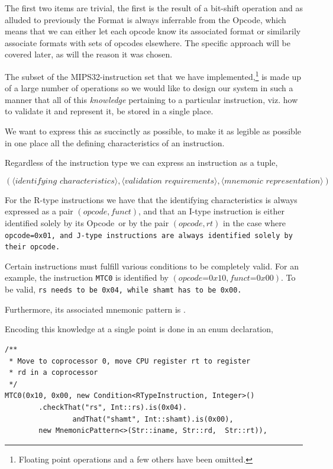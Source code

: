 \documentclass[a4paper]{article}
\newcommand{\opcode}{Opcode\ }
\begin{document}
The first two items are trivial, the first is the result of a
bit-shift operation and as alluded to previously the Format is always
inferrable from the Opcode, which means that we can either let each
opcode know its associated format or similarily associate formats
with sets of opcodes elsewhere. The specific approach will be covered
later, as will the reason it was chosen.

The subset of the MIPS32-instruction set that we have
implemented,\footnote{Floating point operations and a few others have
  been omitted.} is made up of a large number of operations so we would
like to design our system in such a manner that all of this
\emph{knowledge} pertaining to a particular instruction, viz. how to
validate it and represent it, be stored in a single place.

We want to express this as succinctly as possible, to make it as
legible as possible in one place all the defining characteristics
of an instruction.

Regardless of the instruction type we can express an instruction
as a tuple,

\begin{equation*}
(\langle \textit{identifying characteristics} \rangle, \langle
  \textit{validation requirements} \rangle, \langle \textit{mnemonic
    representation} \rangle)
\end{equation*}

For the R-type instructions we have that the identifying
characteristics is always expressed as a pair $(\textit{opcode},
\textit{funct})$, and that an I-type instruction is either identified
solely by its \opcode or by the pair $(\textit{opcode}, \textit{rt})$
in the case where \tt{opcode=0x01}, and J-type instructions are always
identified solely by their opcode.

Certain instructions must fulfill various conditions to be completely
valid. For an example, the instruction \texttt{MTC0} is identified by
$(\textit{opcode=0x10}, \textit{funct=0x00})$. To be valid, \tt{rs}
needs to be \tt{0x04}, while \tt{shamt} has to be \tt{0x00}.

Furthermore, its associated mnemonic pattern is .

Encoding this knowledge at a single point is done in an enum declaration,

\begin{verbatim}
/**
 * Move to coprocessor 0, move CPU register rt to register
 * rd in a coprocessor
 */
MTC0(0x10, 0x00, new Condition<RTypeInstruction, Integer>()
        .checkThat("rs", Int::rs).is(0x04).
                andThat("shamt", Int::shamt).is(0x00),
        new MnemonicPattern<>(Str::iname, Str::rd,  Str::rt)),
\end{verbatim}
\end{document}
